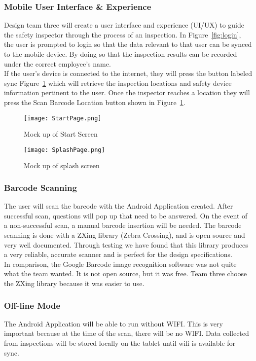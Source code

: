 \documentclass[Letter,11pt]{article}
\begin{document}
	\subsubsection{Mobile User Interface \& Experience}
	Design team three will create a user interface and experience (UI/UX) to guide the safety inspector through the process of an inspection. In  Figure~\ref{fig:login}, the user is prompted to login so that the data relevant to that user can be synced to the mobile device. By doing so that the inspection results can be recorded under the correct employee's name. \\
	If the user's device is connected to the internet, they will press the button labeled sync Figure~\ref{fig:splash} which will retrieve the inspection locations and safety device information pertinent to the user.
	Once the inspector reaches a location they will press the Scan Barcode Location button shown in Figure~\ref{fig:splash}.
	\begin{figure}[h]

		\begin{minipage}{0.5\textwidth}
			\centering
			\texttt{[image: StartPage.png]}
			\caption{\label{fig:login}Mock up of Start Screen}
		\end{minipage}%
		\begin{minipage}{0.5\textwidth}
			\centering
			\texttt{[image: SplashPage.png]}
			\caption{\label{fig:splash}Mock up of splash screen}
		\end{minipage}
	\end{figure}

	\subsubsection{Barcode Scanning}
	The user will scan the barcode with the Android Application created. After successful scan, questions will pop up that need to be answered. On the event of a non-successful scan, a manual barcode insertion will be needed. The barcode scanning is done with a ZXing library (Zebra Crossing), and is open source and very well documented. Through testing we have found that this library produces a very reliable, accurate scanner and is perfect for the design specifications.\\
	In comparison, the Google Barcode  image recognition software was not quite what the team wanted. It is not open source, but it was free. Team three choose the ZXing library because it was easier to use.
	\subsubsection{Off-line Mode}
	The Android Application will be able to run without WIFI. This is very important because at the time of the scan, there will be no WIFI. Data collected from inspections will be stored locally on the tablet until wifi is available for sync. 
\end{document}
